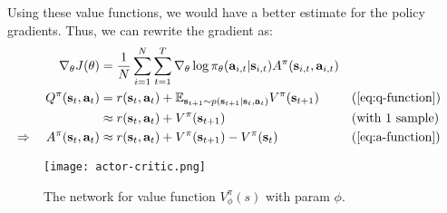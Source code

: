 Using these value functions, we would have a better estimate for the policy gradients. Thus, we can rewrite the gradient as:
\begin{align}
	\nabla_\theta J(\theta) &= \frac{1}{N} \sum_{i=1}^N\sum_{t=1}^T \nabla_\theta\log\pi_{\theta}( \textbf{a}_{i,t}|\textbf{s}_{i,t} ) A^\pi(\textbf{s}_{i,t}, \textbf{a}_{i,t} )\\
	Q^\pi(\textbf{s}_t, \textbf{a}_t) &= r(\textbf{s}_t, \textbf{a}_t) + \mathbb{E}_{\textbf{s}_{t+1}\sim p(\textbf{s}_{t+1} | \textbf{s}_t, \textbf{a}_t)} V^\pi(\textbf{s}_{t+1}) && \text{(\eqref{eq:q-function})}\\
	&\approx r(\textbf{s}_t, \textbf{a}_t) + V^\pi(\textbf{s}_{t+1}) &&\text{(with 1 sample)}\\
	\Rightarrow \quad A^\pi(\textbf{s}_t, \textbf{a}_t) &\approx r(\textbf{s}_t, \textbf{a}_t) + V^\pi(\textbf{s}_{t+1}) - V^\pi(\textbf{s}_t) && \text{(\eqref{eq:a-function})}	
\end{align}

\begin{figure}[hbt!]
	\centering
	\texttt{[image: actor-critic.png]}
	\caption{The network for value function $V_{\phi}^\pi(s)$ with \ac{param} $\phi$.}
	\label{fig:actor-critic}
\end{figure}

